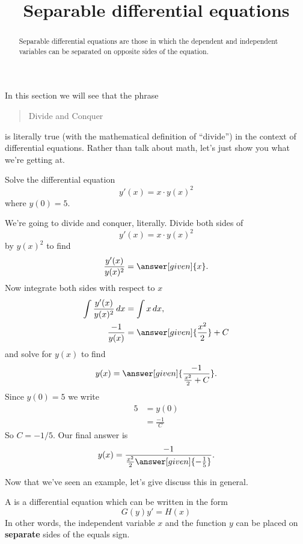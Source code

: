 \documentclass{ximera}
\title[Dig-In:]{Separable differential equations}
\begin{document}
\begin{abstract}
  Separable differential equations are those in which the dependent and independent variables can be separated on opposite sides of the equation.
\end{abstract}
\maketitle

In this section we will see that the phrase
\begin{quote}
  Divide and Conquer
\end{quote}
is literally true (with the mathematical definition of ``divide'') in
the context of differential equations. Rather than talk about math,
let's just show you what we're getting at.

\begin{example}
  Solve the differential equation
  \[
  y'(x) = x\cdot y(x)^2
  \]
  where $y(0)= 5$.
  \begin{explanation}
    We're going to divide and conquer, literally. Divide both sides of
    \[
    y'(x) = x\cdot y(x)^2
    \]
    by $y(x)^2$ to find
    \[
    \frac{y'(x)}{y(x)^2} = \answer[given]{x}.
    \]
    Now integrate both sides with respect to $x$
    \begin{align*}
      \int \frac{y'(x)}{y(x)^2} \d x &= \int x \d x,\\
      \frac{-1}{y(x)} &= \answer[given]{\frac{x^2}{2}}+C
    \end{align*}
    and solve for $y(x)$ to find
    \[
    y(x) = \answer[given]{\frac{-1}{\frac{x^2}{2}+C}}.
    \]
    Since $y(0) =5$ we write
    \begin{align*}
    5&= y(0)\\
    &=\frac{-1}{C}
    \end{align*}
    So $C= -1/5$. Our final answer is
    \[
    y(x) = \frac{-1}{\frac{x^2}{2} \answer[given]{-\frac{1}{5}}}.
    \]
  \end{explanation}
\end{example}

Now that we've seen an example, let's give discuss this in general.

\begin{definition}
  A  is a differential equation
  which can be written in the form
  \[
  G(y) y' = H(x)
  \]
  In other words, the independent variable $x$ and the function $y$
  can be placed on \textbf{separate} sides of the equals sign.
\end{definition}
\end{document}
